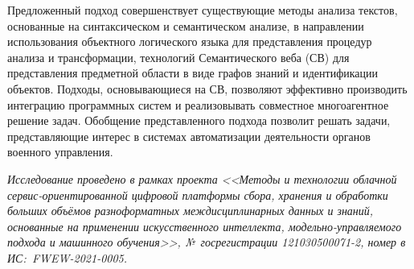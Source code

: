 \documentclass[12pt]{article}
\begin{document}
Предложенный подход совершенствует существующие методы анализа текстов, основанные на синтаксическом и семантическом анализе, в направлении использования объектного логического языка для представления процедур анализа и трансформации, технологий Семантического веба (СВ) для представления предметной области в виде графов знаний и идентификации объектов.  Подходы, основывающиеся на СВ, позволяют эффективно производить интеграцию программных систем и реализовывать совместное многоагентное решение задач.  Обобщение представленного подхода позволит решать задачи, представляющие
интерес в системах автоматизации деятельности органов военного управления.

\textit{Исследование проведено в рамках проекта <<Методы и технологии облачной сервис-ориентированной цифровой платформы сбора, хранения и обработки больших объёмов разноформатных междисциплинарных данных и знаний, основанные на применении искусственного интеллекта, модельно-управляемого подхода и машинного обучения>>, №~госрегистрации 121030500071-2, номер в ИС:~FWEW-2021-0005.}
\renewcommand\refname{\centering Литература}
\end{document}
